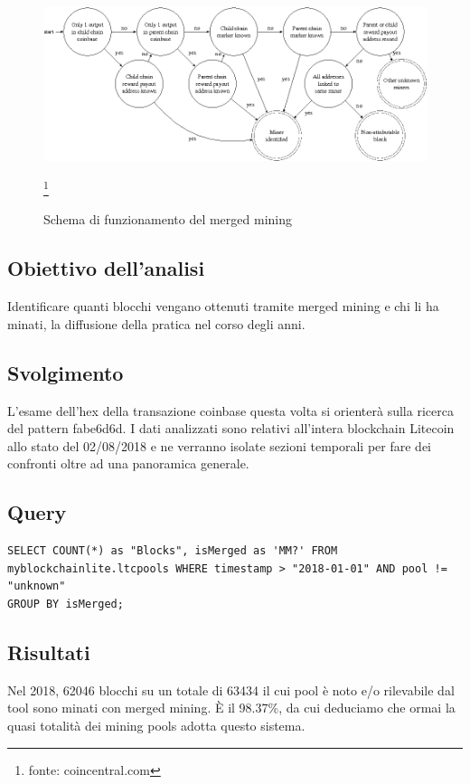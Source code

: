 \begin{figure}
	\centering
	\includegraphics[width=1.0\linewidth]{images/mergedminingdiagramsemanticscholar}
	\caption{Schema di funzionamento del merged mining}
	\label{fig:mergedminingdiagramsemanticscholar}
	\footnote{fonte: coincentral.com}
\end{figure}

\subsection{Obiettivo dell’analisi}
Identificare quanti blocchi vengano ottenuti tramite merged mining e chi li ha minati, la diffusione della pratica nel corso degli anni.
\subsection{Svolgimento}
L’esame dell’hex della transazione coinbase questa volta si orienterà sulla ricerca del pattern fabe6d6d. I dati analizzati sono relativi all'intera blockchain Litecoin allo stato del 02/08/2018 e ne verranno isolate sezioni temporali per fare dei confronti oltre ad una panoramica generale.
\subsection{Query}

\begin{lstlisting}
SELECT COUNT(*) as "Blocks", isMerged as 'MM?' FROM myblockchainlite.ltcpools WHERE timestamp > "2018-01-01" AND pool != "unknown"
GROUP BY isMerged;
\end{lstlisting}

\subsection{Risultati}


Nel 2018, 62046 blocchi su un totale di 63434 il cui pool è noto e/o rilevabile dal tool sono minati con merged mining. È il 98.37\%, da cui deduciamo che ormai la quasi totalità dei mining pools adotta questo sistema.

